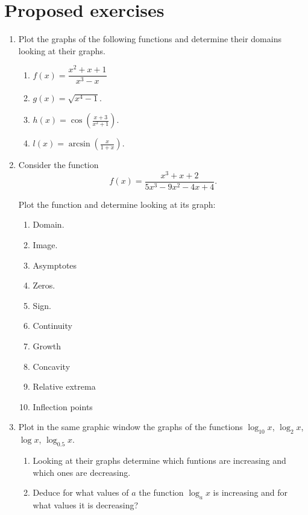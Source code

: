 \section{Proposed exercises}
\begin{enumerate}[leftmargin=*]
\item Plot the graphs of the following functions and determine their domains looking at their graphs.

      \begin{enumerate}
      \item $f(x)=\dfrac{x^2+x+1}{x^3-x}$
      \item $g(x)=\sqrt{x^4-1}$.
      \item $h(x)=\cos\left(\frac{x+3}{x^2+1}\right)$.
      \item $l(x)=\arcsin\left(\frac{x}{1+x}\right)$.
      \end{enumerate}

\item Consider the function
      \[
      f(x)=\frac{x^3+x+2}{5x^3-9x^2-4x+4}.
      \]

      Plot the function and determine looking at its graph:
      \begin{enumerate}
      \item Domain.
      \item Image.
      \item Asymptotes
      \item Zeros.
      \item Sign.
      \item Continuity
      \item Growth
      \item Concavity
      \item Relative extrema
      \item Inflection points
      \end{enumerate}

\item Plot in the same graphic window the graphs of the functions $\log_{10}x$, $\log_{2}x$, $\log x$, $\log_{0.5}x$.
      \begin{enumerate}
      \item Looking at their graphs determine which funtions are increasing and which ones are decreasing.
      \item Deduce for what values of $a$ the function $\log_ax$ is increasing and for what values it is decreasing?
      \end{enumerate}


\end{enumerate}
